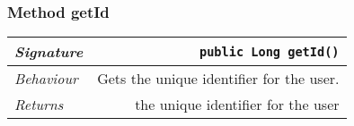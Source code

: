 \begin{adjustwidth}{1.5em}{0pt}
\begin{adjustwidth}{1.5em}{0pt}
\begin{adjustwidth}{1.5em}{0pt}
{\begin{tabularx}{1.0\linewidth}{@{}l R@{}}
      \end{tabularx}}
    \end{adjustwidth}\subsubsection{Method getId\label{edu.kit.hci.soli.domain.User@getId()}}
    \begin{adjustwidth}{1.5em}{0pt}
      {\begin{tabularx}{1.0\linewidth}{@{}l R@{}}
        \emph{Signature} & \texttt{public \texttt{Long} getId()} \\
        \hline
        \emph{Behaviour} & Gets the unique identifier for the user.    \\
        \hline
        \emph{Returns} & the unique identifier for the user  \\
        \hline
  
      \end{tabularx}}
    \end{adjustwidth}
  \end{adjustwidth}
\end{adjustwidth}